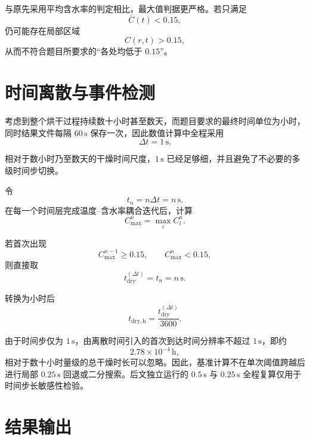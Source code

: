 \documentclass[UTF8,a4paper,12pt]{ctexart}
\begin{document}
与原先采用平均含水率的判定相比，最大值判据更严格。若只满足
\[
\overline C(t)<0.15,
\]
仍可能存在局部区域
\[
C(r,t)>0.15,
\]
从而不符合题目所要求的“各处均低于 $0.15$”。

\section{时间离散与事件检测}

考虑到整个烘干过程持续数十小时甚至数天，而题目要求的最终时间单位为小时，同时结果文件每隔 $60\,\mathrm{s}$ 保存一次，因此数值计算中全程采用
\begin{equation}
    \boxed{\Delta t=1\,\mathrm{s}}.
    \label{eq:dt}
\end{equation}

相对于数小时乃至数天的干燥时间尺度，$1\,\mathrm{s}$ 已经足够细，并且避免了不必要的多级时间步切换。

令
\begin{equation}
    t_n=n\Delta t=n\,\mathrm{s}.
\end{equation}
在每一个时间层完成温度--含水率耦合迭代后，计算
\begin{equation}
    C_{\max}^n=\max_i C_i^n.
\end{equation}

若首次出现
\begin{equation}
    C_{\max}^{n-1}\ge0.15,
    \qquad
    C_{\max}^{n}<0.15,
    \label{eq:first_cross}
\end{equation}
则直接取
\begin{equation}
    t_{\mathrm{dry}}^{(\Delta t)}
    =
    t_n
    =
    n\,\mathrm{s}.
    \label{eq:tdry_discrete}
\end{equation}

转换为小时后
\begin{equation}
    t_{\mathrm{dry,h}}
    =
    \frac{t_{\mathrm{dry}}^{(\Delta t)}}{3600}.
    \label{eq:tdry_hour}
\end{equation}

由于时间步仅为 $1\,\mathrm{s}$，由离散时间引入的首次到达时间分辨率不超过 $1\,\mathrm{s}$，即约
\[
2.78\times10^{-4}\,\mathrm{h},
\]
相对于数十小时量级的总干燥时长可以忽略。因此，基准计算不在单次阈值跨越后进行局部 $0.25\,\mathrm{s}$ 回退或二分搜索。后文独立运行的 $0.5\,\mathrm{s}$ 与 $0.25\,\mathrm{s}$ 全程复算仅用于时间步长敏感性检验。

\section{结果输出}
\end{document}
